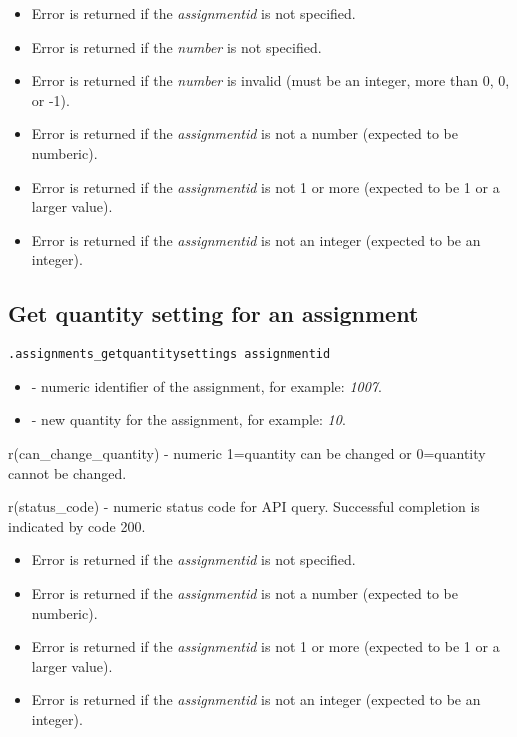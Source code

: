\errheader
\begin{itemize}
    \item Error  is returned if the \textit{assignmentid} is not specified.
    \item Error  is returned if the \textit{number} is not specified.
    \item Error  is returned if the \textit{number} is invalid (must be an integer, more than 0, 0, or -1).
    \item Error  is returned if the \textit{assignmentid} is not a number (expected to be numberic).
    \item Error  is returned if the \textit{assignmentid} is not 1 or more (expected to be 1 or a larger value).
    \item Error  is returned if the \textit{assignmentid} is not an integer (expected to be an integer).
\end{itemize}


\subsection{Get quantity setting for an assignment}

\begin{lstlisting}[style=CommandLineStyle]
.assignments_getquantitysettings assignmentid
\end{lstlisting}

\paramsheader
\begin{itemize}
    \item {} - numeric identifier of the assignment, for example: \textit{1007}.
    \item {} - new quantity for the assignment, for example: \textit{10}.
\end{itemize}

\savedres
\begin{compactitem}
    \item r(can\_change\_quantity) - numeric 1=quantity can be changed or 0=quantity cannot be changed.
    \item r(status\_code)  - numeric status code for API query. Successful completion is indicated by code 200.
\end{compactitem}

\errheader
\begin{itemize}
    \item Error  is returned if the \textit{assignmentid} is not specified.
    \item Error  is returned if the \textit{assignmentid} is not a number (expected to be numberic).
    \item Error  is returned if the \textit{assignmentid} is not 1 or more (expected to be 1 or a larger value).
    \item Error  is returned if the \textit{assignmentid} is not an integer (expected to be an integer).
\end{itemize}


